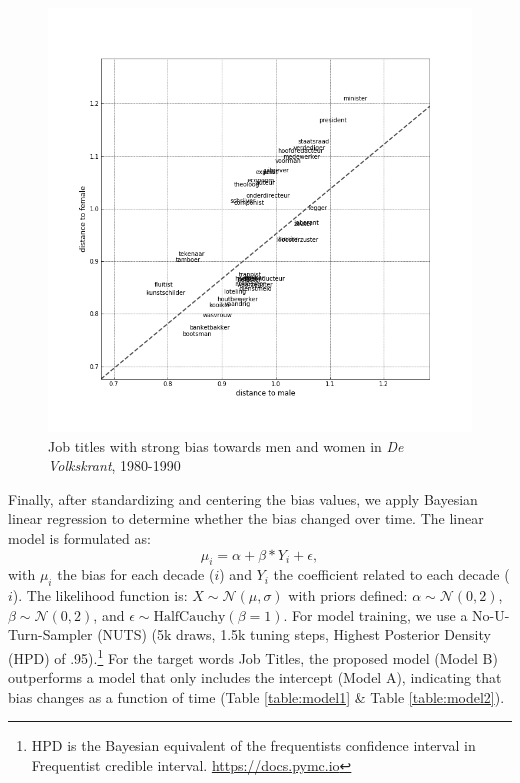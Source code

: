 \documentclass[11pt,a4paper]{article}
\begin{document}
\begin{figure}
  \includegraphics[width=\linewidth]{figures/example_jobs}
  \vspace*{-10mm}
  \caption{Job titles with strong bias towards men and women in \textit{De Volkskrant}, 1980-1990}
  \label{fig:example}
\end{figure}

Finally, after standardizing and centering the bias values, we apply Bayesian linear regression to determine whether the bias changed over time. The linear model is formulated as:
\[\mu_i = \alpha + \beta * Y_{i} + \epsilon,\]
with $\mu_{i}$ the bias for each decade ($i$) and $Y_{i}$ the coefficient related to each decade ($i$). The likelihood function is: $X \sim \mathcal{N}(\mu, \sigma)$ with priors defined: $\alpha \sim \mathcal{N}(0, 2)$, $\beta \sim \mathcal{N}(0, 2)$, and $\epsilon \sim \mathrm{HalfCauchy}(\beta = 1)$. For model training, we use a No-U-Turn-Sampler (NUTS) (5k draws, 1.5k tuning steps, Highest Posterior Density (HPD) of .95).\footnote{HPD is the Bayesian equivalent of the frequentists confidence interval in Frequentist credible interval. \url{https://docs.pymc.io}} For the target words Job Titles, the proposed model (Model B) outperforms a model that only includes the intercept (Model A), indicating that bias changes as a function of time (Table \ref{table:model1} \& Table \ref{table:model2}). 
\end{document}
